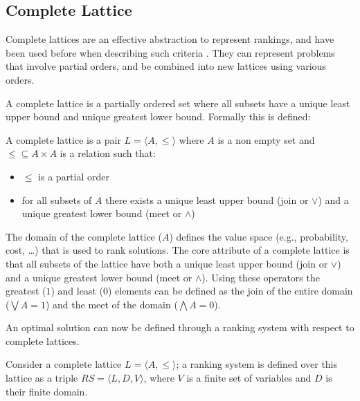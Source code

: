 \subsection{Complete Lattice}
Complete lattices are an effective abstraction to represent rankings,
and have been used before when describing such criteria \citep{Bistarelli1997,Fernandez}.
They can represent problems that involve partial orders, and be combined into new lattices using various orders.

A complete lattice is a partially ordered set where all subsets have a unique least upper bound and unique greatest lower bound.
Formally this is defined:
\begin{defs}
A complete lattice is a pair $L = \langle A, \leq \rangle$ where $A$ is a non empty set 
and $\leq \subseteq A \times A$ is a relation such that:
\begin{itemize}
  \item $\leq$ is a partial order
  \item for all subsets of $A$ there exists a unique least upper bound (join or $\vee$) and a unique greatest lower bound (meet or $\wedge$)
\end{itemize}
\end{defs}

The domain of the complete lattice ($A$) defines the value space (e.g., probability, cost, \ldots) 
that is used to rank solutions. 
The core attribute of a complete lattice is that all subsets of the lattice have both a unique least upper bound (join or $\vee$) 
and a unique greatest lower bound (meet or $\wedge$).
Using these operators the greatest ($1$) and least ($0$) elements can be defined as
the join of the entire domain ($\bigvee A = 1$) and the meet of the domain ($\bigwedge A = 0$).

An optimal solution can now be defined through a ranking system with respect to complete lattices.
\begin{defs}
Consider a complete lattice $L = \langle A, \leq \rangle$; 
a ranking system is defined over this lattice as a triple $RS = \langle L, D, V \rangle$, 
where $V$ is a finite set of variables and $D$ is their finite domain.
\end{defs}

